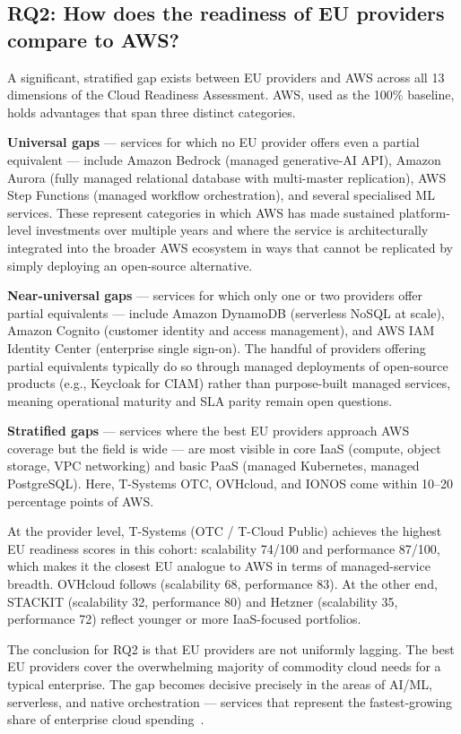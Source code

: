 \subsection{RQ2: How does the readiness of EU providers compare to AWS?}

A significant, stratified gap exists between EU providers and AWS across all 13 dimensions of the Cloud Readiness Assessment. AWS, used as the 100\% baseline, holds advantages that span three distinct categories.

\textbf{Universal gaps} — services for which no EU provider offers even a partial equivalent — include Amazon Bedrock (managed generative-AI API), Amazon Aurora (fully managed relational database with multi-master replication), AWS Step Functions (managed workflow orchestration), and several specialised ML services. These represent categories in which AWS has made sustained platform-level investments over multiple years and where the service is architecturally integrated into the broader AWS ecosystem in ways that cannot be replicated by simply deploying an open-source alternative.

\textbf{Near-universal gaps} — services for which only one or two providers offer partial equivalents — include Amazon DynamoDB (serverless NoSQL at scale), Amazon Cognito (customer identity and access management), and AWS IAM Identity Center (enterprise single sign-on). The handful of providers offering partial equivalents typically do so through managed deployments of open-source products (e.g., Keycloak for CIAM) rather than purpose-built managed services, meaning operational maturity and SLA parity remain open questions.

\textbf{Stratified gaps} — services where the best EU providers approach AWS coverage but the field is wide — are most visible in core IaaS (compute, object storage, VPC networking) and basic PaaS (managed Kubernetes, managed PostgreSQL). Here, T-Systems OTC, OVHcloud, and IONOS come within 10–20 percentage points of AWS.

At the provider level, T-Systems (OTC / T-Cloud Public) achieves the highest EU readiness scores in this cohort: scalability 74/100 and performance 87/100, which makes it the closest EU analogue to AWS in terms of managed-service breadth. OVHcloud follows (scalability 68, performance 83). At the other end, STACKIT (scalability 32, performance 80) and Hetzner (scalability 35, performance 72) reflect younger or more IaaS-focused portfolios.

The conclusion for RQ2 is that EU providers are not uniformly lagging. The best EU providers cover the overwhelming majority of commodity cloud needs for a typical enterprise. The gap becomes decisive precisely in the areas of AI/ML, serverless, and native orchestration — services that represent the fastest-growing share of enterprise cloud spending~\cite{Flexera_CloudReport_2024}.

